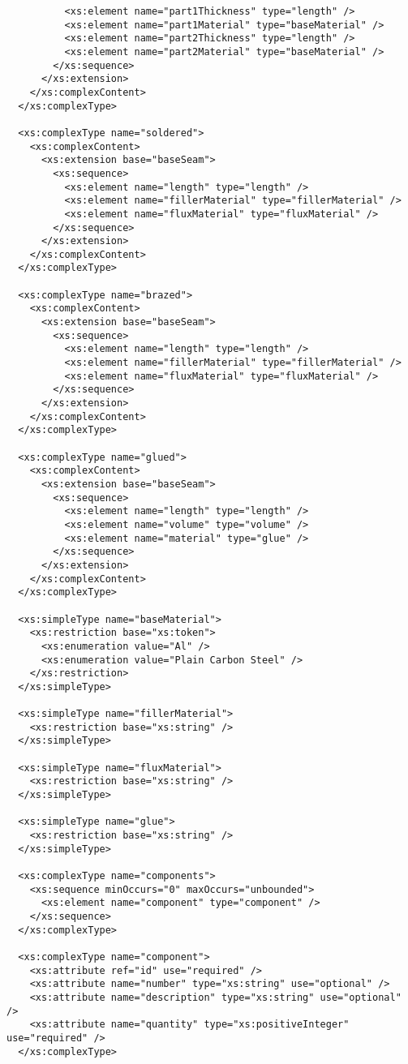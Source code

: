 \begin{lstlisting}
          <xs:element name="part1Thickness" type="length" />
          <xs:element name="part1Material" type="baseMaterial" />
          <xs:element name="part2Thickness" type="length" />
          <xs:element name="part2Material" type="baseMaterial" />
        </xs:sequence>
      </xs:extension>
    </xs:complexContent>
  </xs:complexType>

  <xs:complexType name="soldered">
    <xs:complexContent>
      <xs:extension base="baseSeam">
        <xs:sequence>
          <xs:element name="length" type="length" />
          <xs:element name="fillerMaterial" type="fillerMaterial" />
          <xs:element name="fluxMaterial" type="fluxMaterial" />
        </xs:sequence>
      </xs:extension>
    </xs:complexContent>
  </xs:complexType>

  <xs:complexType name="brazed">
    <xs:complexContent>
      <xs:extension base="baseSeam">
        <xs:sequence>
          <xs:element name="length" type="length" />
          <xs:element name="fillerMaterial" type="fillerMaterial" />
          <xs:element name="fluxMaterial" type="fluxMaterial" />
        </xs:sequence>
      </xs:extension>
    </xs:complexContent>
  </xs:complexType>

  <xs:complexType name="glued">
    <xs:complexContent>
      <xs:extension base="baseSeam">
        <xs:sequence>
          <xs:element name="length" type="length" />
          <xs:element name="volume" type="volume" />
          <xs:element name="material" type="glue" />
        </xs:sequence>
      </xs:extension>
    </xs:complexContent>
  </xs:complexType>

  <xs:simpleType name="baseMaterial">
    <xs:restriction base="xs:token">
      <xs:enumeration value="Al" />
      <xs:enumeration value="Plain Carbon Steel" />
    </xs:restriction>
  </xs:simpleType>

  <xs:simpleType name="fillerMaterial">
    <xs:restriction base="xs:string" />
  </xs:simpleType>

  <xs:simpleType name="fluxMaterial">
    <xs:restriction base="xs:string" />
  </xs:simpleType>

  <xs:simpleType name="glue">
    <xs:restriction base="xs:string" />
  </xs:simpleType>

  <xs:complexType name="components">
    <xs:sequence minOccurs="0" maxOccurs="unbounded">
      <xs:element name="component" type="component" />
    </xs:sequence>
  </xs:complexType>

  <xs:complexType name="component">
    <xs:attribute ref="id" use="required" />
    <xs:attribute name="number" type="xs:string" use="optional" />
    <xs:attribute name="description" type="xs:string" use="optional" />
    <xs:attribute name="quantity" type="xs:positiveInteger" use="required" />
  </xs:complexType>


\end{lstlisting}
